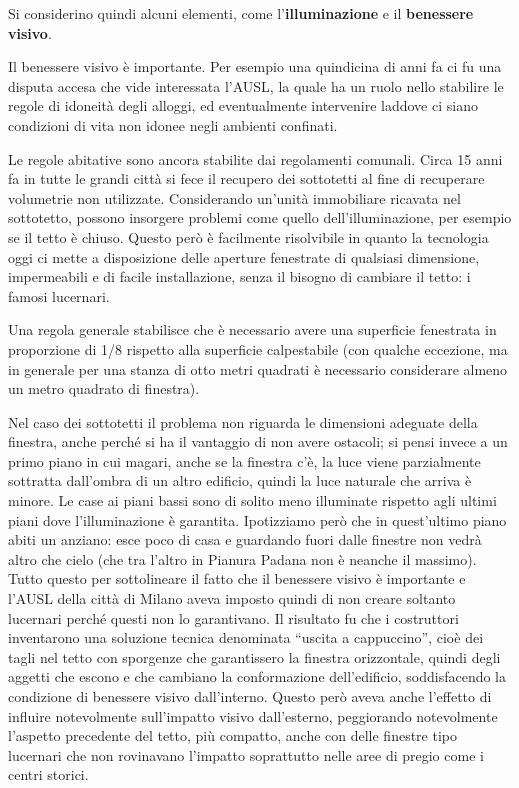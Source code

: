 Si considerino quindi alcuni elementi, come l'\textbf{illuminazione} e
il \textbf{benessere visivo}.

Il benessere visivo è importante. Per esempio una quindicina di anni fa
ci fu una disputa accesa che vide interessata l'AUSL, la quale ha un
ruolo nello stabilire le regole di idoneità degli alloggi, ed
eventualmente intervenire laddove ci siano condizioni di vita non idonee
negli ambienti confinati.

Le regole abitative sono ancora stabilite dai regolamenti comunali.
Circa 15 anni fa in tutte le grandi città si fece il recupero dei
sottotetti al fine di recuperare volumetrie non utilizzate. Considerando
un'unità immobiliare ricavata nel sottotetto, possono insorgere problemi
come quello dell'illuminazione, per esempio se il tetto è chiuso. Questo
però è facilmente risolvibile in quanto la tecnologia oggi ci mette a
disposizione delle aperture fenestrate di qualsiasi dimensione,
impermeabili e di facile installazione, senza il bisogno di cambiare il
tetto: i famosi lucernari.

Una regola generale stabilisce che è necessario avere una superficie
fenestrata in proporzione di 1/8 rispetto alla superficie calpestabile
(con qualche eccezione, ma in generale per una stanza di otto metri
quadrati è necessario considerare almeno un metro quadrato di finestra).

Nel caso dei sottotetti il problema non riguarda le dimensioni adeguate
della finestra, anche perché si ha il vantaggio di non avere ostacoli;
si pensi invece a un primo piano in cui magari, anche se la finestra
c'è, la luce viene parzialmente sottratta dall'ombra di un altro
edificio, quindi la luce naturale che arriva è minore. Le case ai piani
bassi sono di solito meno illuminate rispetto agli ultimi piani dove
l'illuminazione è garantita. Ipotizziamo però che in quest'ultimo piano
abiti un anziano: esce poco di casa e guardando fuori dalle finestre non
vedrà altro che cielo (che tra l'altro in Pianura Padana non è neanche
il massimo). Tutto questo per sottolineare il fatto che il benessere
visivo è importante e l'AUSL della città di Milano aveva imposto quindi
di non creare soltanto lucernari perché questi non lo garantivano. Il
risultato fu che i costruttori inventarono una soluzione tecnica
denominata ``uscita a cappuccino'', cioè dei tagli nel tetto con
sporgenze che garantissero la finestra orizzontale, quindi degli aggetti
che escono e che cambiano la conformazione dell'edificio, soddisfacendo
la condizione di benessere visivo dall'interno. Questo però aveva anche
l'effetto di influire notevolmente sull'impatto visivo dall'esterno,
peggiorando notevolmente l'aspetto precedente del tetto, più compatto,
anche con delle finestre tipo lucernari che non rovinavano l'impatto
soprattutto nelle aree di pregio come i centri storici.

